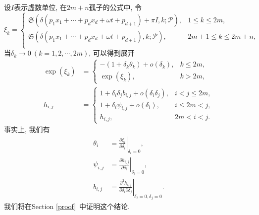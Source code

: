 \documentclass[12pt,a4paper,UTF8]{article}
\numberwithin{equation}{section}
\newcommand{\sbrace}[1]{\left(#1\right)}
\newcommand{\eval}[2]{\left.{#1}\right|_{#2}}
\newcommand{\PS}{\mathcal{P}}
\newcommand{\DIFF}[2]{\ensuremath{\frac{\partial #1}{\partial #2}}}
\newcommand{\SP}{\mathfrak{S}} %
\newcommand{\refsec}[1]{Section \ref{#1}~}
\begin{document}
设$I$表示虚数单位, 在$2m+n$孤子的公式中, 令
\begin{equation}
\xi_k=\left\{\begin{array}{ll}
  \SP\sbrace{\delta\sbrace{p_1 x_1+\cdots+p_d x_d+\omega t+p_{d+1}} +\pi I,k;\PS} ,&  1\le k\le 2m,\\
  \SP\sbrace{\delta\sbrace{p_1 x_1+\cdots+p_d x_d+\omega t+p_{d+1}},k;\PS} ,&  2m+1\le k \le 2m+n, \\
\end{array}\right. 
\end{equation}
当$\delta_k\to 0~(k=1,2,\cdots,2m)$, 可以得到展开
\begin{equation}
\begin{aligned}
  \exp\sbrace{\xi_k}&=\left\{\begin{array}{ll}
    -\sbrace{1+\delta_k \theta_k}+o\sbrace{\delta_k}, & k\le 2m, \\ 
    \exp\sbrace{\xi_k}, & k>2m,   
    \end{array}\right. \\ 
  h_{i,j}&=\left\{\begin{array}{ll}
    1+\delta_i \delta_j b_{i,j}+o\sbrace{\delta_i \delta_j}, & i<j\le 2m, \\
    1+\delta_i \psi_{i,j}+o\sbrace{\delta_i}, & i\le 2m < j , \\
    h_{i,j}, & 2m<i<j.
    \end{array}\right.
\end{aligned}
\label{expand}
\end{equation}
事实上, 我们有 
\begin{equation}
\begin{aligned} 
\theta_i &= \eval{\DIFF{\xi_i}{\delta_i}}{\delta_i=0},\\ 
\psi_{i,j} &= \eval{\DIFF{h_{i,j}}{\delta_i}}{\delta_i=0} ,\\ 
b_{i,j} &= \eval{\frac{\partial^2 h_{i,j}}{\partial \delta_i \partial \delta_j}}{\delta_i=0,\delta_j=0} .
\end{aligned}
\label{params}
\end{equation}
我们将在\refsec{proof}中证明这个结论. 
\end{document}
